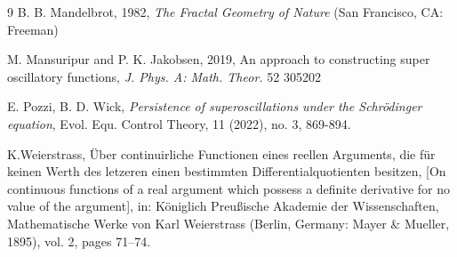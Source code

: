 \documentclass[reqno,11pt]{amsart}
\theoremstyle{definition}
\begin{document}
\begin{thebibliography}{9}
B. B. Mandelbrot, 1982, \textit{The Fractal Geometry of Nature} (San Francisco, CA: Freeman)


  M. Mansuripur and P. K. Jakobsen, 2019, An approach to constructing super oscillatory functions, \textit{J. Phys. A: Math. Theor.} 52
305202     


E. Pozzi,  B. D. Wick, {\em Persistence of superoscillations under the Schr\"odinger equation},
 Evol. Equ. Control Theory, 11 (2022), no. 3, 869-894.



 K.Weierstrass, Über continuirliche Functionen eines reellen Arguments, die für keinen Werth des letzeren einen bestimmten Differentialquotienten besitzen, [On continuous functions of a real argument which possess a definite derivative for no value of the argument], in: Königlich Preußische Akademie der Wissenschaften, Mathematische Werke von Karl Weierstrass (Berlin, Germany: Mayer \& Mueller, 1895), vol. 2, pages 71–74.







\end{thebibliography}
\end{document}
